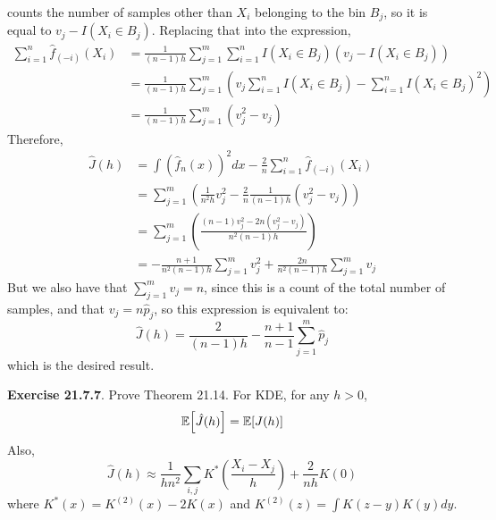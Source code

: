 counts the number of samples other than \(X_{i}\) belonging to the bin
\(B_{j}\), so it is equal to \(v_{j} - I(X_{i} \in B_{j})\). Replacing that into
the expression,
\begin{align*}
\sum_{i=1}^{n} \hat{f}_{(-i)}(X_{i}) &= \frac{1}{(n - 1)h} \sum_{j=1}^m \sum_{i=1}^{n} I(X_{i} \in B_{j}) (v_{j} - I(X_{i} \in B_{j})) \\
&= \frac{1}{(n - 1)h} \sum_{j=1}^m \left( v_{j} \sum_{i=1}^{n} I(X_{i} \in B_{j}) - \sum_{i=1}^{n} I(X_{i} \in B_{j})^{2} \right) \\
&= \frac{1}{(n - 1)h} \sum_{j=1}^m \left( v_{j}^{2} - v_{j} \right)
\end{align*}
Therefore,
\begin{align*}
\hat{J}(h) &= \int \left( \hat{f}_{n}(x) \right)^{2} dx - \frac{2}{n} \sum_{i=1}^{n} \hat{f}_{(-i)}(X_{i}) \\
&= \sum_{j=1}^m \left( \frac{1}{n^{2}h} v_{j}^{2} - \frac{2}{n} \frac{1}{(n - 1)h} \left( v_{j}^{2} - v_{j} \right) \right)\\
&= \sum_{j=1}^m \left( \frac{(n - 1) v_{j}^{2} - 2n(v_{j}^{2} - v_{j})}{n^{2}(n - 1)h} \right) \\
&= - \frac{n+1}{n^{2}(n - 1)h} \sum_{j=1}^m v_{j}^{2} + \frac{2n}{n^{2}(n - 1)h} \sum_{j=1}^m v_{j}
\end{align*}
But we also have that \(\sum_{j=1}^m v_{j} = n\), since this is a count of
the total number of samples, and that \(v_{j} = n \hat{p}_{j}\), so this
expression is equivalent to:
\[
\hat{J}(h) = \frac{2}{(n - 1)h} - \frac{n + 1}{n - 1} \sum_{j=1}^m \hat{p}_{j}
\]
which is the desired result.

\textbf{Exercise 21.7.7}. Prove Theorem 21.14.
For KDE, for any \(h > 0\),
\[
\EXP \left[ \hat{J}(h) \right] = \EXP \left[ J(h) \right]
\]
Also,
\[
\hat{J}(h) \approx \frac{1}{hn^{2}}\sum_{i, j} K^{*} \left( \frac{X_{i} - X_{j}}{h} \right) + \frac{2}{nh} K(0)
\]
where \(K^{*}(x) = K^{(2)}(x) - 2 K(x)\) and
\(K^{(2)}(z) = \int K(z - y) K(y) dy\).


